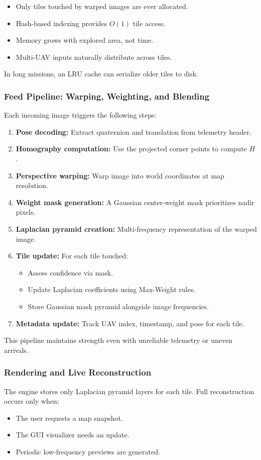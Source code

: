 \documentclass[conference]{IEEEtran}
\begin{document}
\begin{itemize}
    \item Only tiles touched by warped images are ever allocated.
    \item Hash-based indexing provides $O(1)$ tile access.
    \item Memory grows with explored area, not time.
    \item Multi-UAV inputs naturally distribute across tiles.
\end{itemize}
In long missions, an LRU cache can serialize older tiles to disk.

\subsubsection{Feed Pipeline: Warping, Weighting, and Blending}
Each incoming image triggers the following steps:
\begin{enumerate}
    \item \textbf{Pose decoding:} Extract quaternion and translation from telemetry header.
    \item \textbf{Homography computation:} Use the projected corner points to compute $H$.
    \item \textbf{Perspective warping:} Warp image into world coordinates at map resolution.
    \item \textbf{Weight mask generation:} A Gaussian center-weight mask prioritizes nadir pixels.
    \item \textbf{Laplacian pyramid creation:} Multi-frequency representation of the warped image.
    \item \textbf{Tile update:} For each tile touched:
    \begin{itemize}
        \item Assess confidence via mask.
        \item Update Laplacian coefficients using Max-Weight rules.
        \item Store Gaussian mask pyramid alongside image frequencies.
    \end{itemize}
    \item \textbf{Metadata update:} Track UAV index, timestamp, and pose for each tile.
\end{enumerate}
This pipeline maintains strength even with unreliable telemetry or uneven arrivals.

\subsubsection{Rendering and Live Reconstruction}
The engine stores only Laplacian pyramid layers for each tile. Full reconstruction occurs only when:
\begin{itemize}
    \item The user requests a map snapshot.
    \item The GUI visualizer needs an update.
    \item Periodic low-frequency previews are generated.
\end{itemize}
\end{document}
